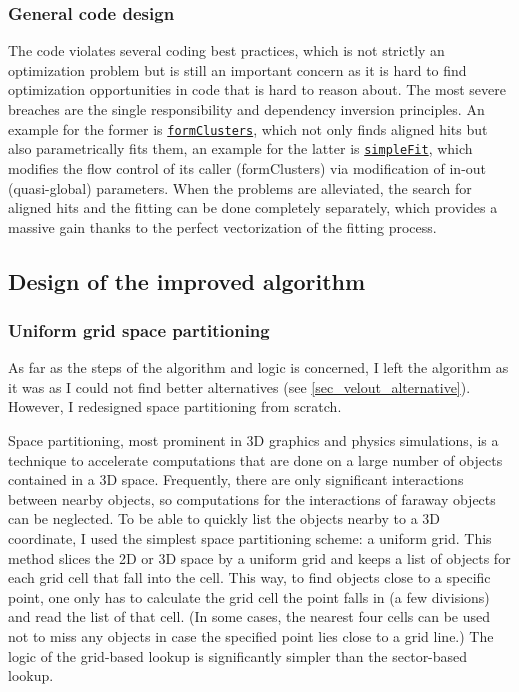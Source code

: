 \documentclass[12pt]{article}
\newcommand{\code}[1]{\texttt{#1}}
\begin{document}
\subsubsection{General code design}

The code violates several coding best practices, which is not strictly an optimization problem but is still an important concern as it is hard to find optimization opportunities in code that is hard to reason about. The most severe breaches are the single responsibility and dependency inversion principles. An example for the former is \href{https://gitlab.cern.ch/lhcb/Rec/blob/1b7edc5aea96f2225601238b3f64e478e41b6c70/Pr/PrVeloUT/src/PrVeloUT.cpp#L337}{\code{formClusters}}, which not only finds aligned hits but also parametrically fits them, an example for the latter is \href{https://gitlab.cern.ch/lhcb/Rec/blob/1b7edc5aea96f2225601238b3f64e478e41b6c70/Pr/PrVeloUT/src/PrVeloUT.h#L191}{\code{simpleFit}}, which modifies the flow control of its caller (formClusters) via modification of in-out (quasi-global) parameters. When the problems are alleviated, the search for aligned hits and the fitting can be done completely separately, which provides a massive gain thanks to the perfect vectorization of the fitting process.


\subsection{Design of the improved algorithm}

\subsubsection{Uniform grid space partitioning}\label{sec_velout_space_partitioning}

As far as the steps of the algorithm and logic is concerned, I left the algorithm as it was as I could not find better alternatives (see \ref{sec_velout_alternative}). However, I redesigned space partitioning from scratch.
\vspace{1pc}

Space partitioning, most prominent in 3D graphics and physics simulations, is a technique to accelerate computations that are done on a large number of objects contained in a 3D space. Frequently, there are only significant interactions between nearby objects, so computations for the interactions of faraway objects can be neglected. To be able to quickly list the objects nearby to a 3D coordinate, I used the simplest space partitioning scheme: a uniform grid. This method slices the 2D or 3D space by a uniform grid and keeps a list of objects for each grid cell that fall into the cell. This way, to find objects close to a specific point, one only has to calculate the grid cell the point falls in (a few divisions) and read the list of that cell. (In some cases, the nearest four cells can be used not to miss any objects in case the specified point lies close to a grid line.) The logic of the grid-based lookup is significantly simpler than the sector-based lookup.
\vspace{1pc}
\end{document}
